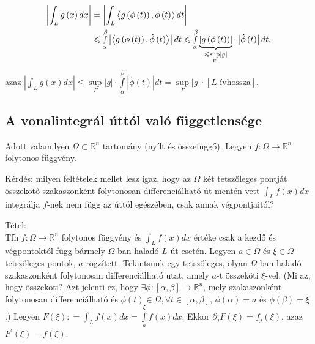\documentclass[12pt,a4paper]{scrartcl}
\newenvironment{tetel}{}{}
\begin{document}
\begin{enumerate}
\[\begin{aligned}
    \left| {\int_L {g\left( x \right)dx} } \right| &  = \left| {\int_L {\left\langle {g\left( {\phi \left( t \right)} \right),\dot \phi \left( t \right)} \right\rangle dt} } \right| \\ 
     &  \leqslant \mathop \smallint \limits_\alpha ^\beta  \left| {\left\langle {g\left( {\phi \left( t \right)} \right),\dot \phi \left( t \right)} \right\rangle } \right|dt \leqslant \mathop \smallint \limits_\alpha ^\beta  \underbrace {\left| {g\left( {\phi \left( t \right)} \right)} \right|}_{ \leqslant \mathop {\sup }\limits_\Gamma  \left| g \right|} \cdot \left| {\dot \phi \left( t \right)} \right|dt, \\ 
  \end{aligned} \] azaz
  \(\left| {\int_{L}{g\left( x \right)dx}} \right| \leq \sup\limits_{\Gamma}\left| g \right| \cdot {\int\limits_{\alpha}^{\beta}{\left| {\overset{.}{\phi}\left( t \right)} \right|dt}} = \sup\limits_{\Gamma}\left| g \right| \cdot \left\lbrack {L\text{~ívhossza}} \right\rbrack\).
\end{enumerate}

\hypertarget{a-vonalintegral-uttol-valo-fuggetlensege}{%
\subsection{A vonalintegrál úttól való
függetlensége}\label{a-vonalintegral-uttol-valo-fuggetlensege}}

Adott valamilyen \(\Omega \subset {\mathbb{R}}^{n}\) tartomány (nyílt és
összefüggő). Legyen
\(\left. f:\Omega\rightarrow{\mathbb{R}}^{n} \right.\) folytonos
függvény.

Kérdés: milyen feltételek mellet lesz igaz, hogy az \(\Omega\) két
tetszőleges pontját összekötő szakaszonként folytonosan differenciálható
út mentén vett \(\int_{L}{f\left( x \right)dx}\) integrálja \(f\)-nek
nem függ az úttól egészében, csak annak végpontjaitól?

\begin{tetel}

Tétel:\\
Tfh \(\left. f:\Omega\rightarrow{\mathbb{R}}^{n} \right.\) folytonos
függvény és \(\int_{L}{f\left( x \right)dx}\) értéke csak a kezdő és
végpontoktól függ bármely \(\Omega\)-ban haladó \(L\) út esetén. Legyen
\(a \in \Omega\) és \(\xi \in \Omega\) tetszőleges pontok, \(a\)
rögzített. Tekintsünk egy tetszőleges, olyan \(\Omega\)-ban haladó
szakaszonként folytonosan differenciálható utat, amely \(a\)-t összeköti
\(\xi\)-vel. (Mi az, hogy összeköti? Azt jelenti ez, hogy
\(\left. \exists\phi:\left\lbrack {\alpha,\beta} \right\rbrack\rightarrow{\mathbb{R}}^{n} \right.\),
mely szakaszonként folytonosan differenciálható és
\(\phi\left( t \right) \in \Omega,\forall t \in \left\lbrack {\alpha,\beta} \right\rbrack\),
\(\phi\left( \alpha \right) = a\) és
\(\phi\left( \beta \right) = \xi\).) Legyen
\(F\left( \xi \right): = {\int_{L}{f\left( x \right)dx}} = {\int\limits_{a}^{\xi}{f\left( x \right)dx}}\).
Ekkor \(\partial_{j}F\left( \xi \right) = f_{j}\left( \xi \right)\),
azaz \(F^{\prime}\left( \xi \right) = f\left( \xi \right)\).

\end{tetel}
\end{document}
